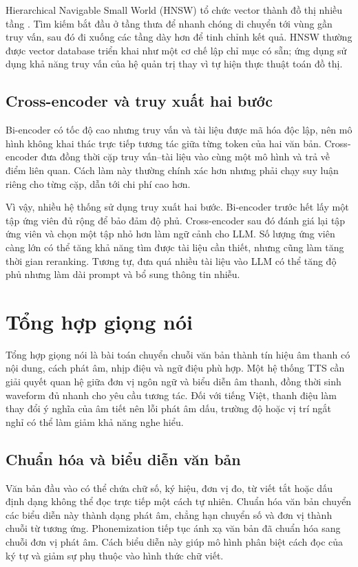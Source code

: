 \documentclass[a4paper,13pt,oneside]{report}
\begin{document}
Hierarchical Navigable Small World (HNSW) tổ chức vector thành đồ thị nhiều tầng \cite{hnsw}. Tìm kiếm bắt đầu ở tầng thưa để nhanh chóng di chuyển tới vùng gần truy vấn, sau đó đi xuống các tầng dày hơn để tinh chỉnh kết quả. HNSW thường được vector database triển khai như một cơ chế lập chỉ mục có sẵn; ứng dụng sử dụng khả năng truy vấn của hệ quản trị thay vì tự hiện thực thuật toán đồ thị.

\subsection{Cross-encoder và truy xuất hai bước}

Bi-encoder có tốc độ cao nhưng truy vấn và tài liệu được mã hóa độc lập, nên mô hình không khai thác trực tiếp tương tác giữa từng token của hai văn bản. Cross-encoder đưa đồng thời cặp truy vấn--tài liệu vào cùng một mô hình và trả về điểm liên quan. Cách làm này thường chính xác hơn nhưng phải chạy suy luận riêng cho từng cặp, dẫn tới chi phí cao hơn.

Vì vậy, nhiều hệ thống sử dụng truy xuất hai bước. Bi-encoder trước hết lấy một tập ứng viên đủ rộng để bảo đảm độ phủ. Cross-encoder sau đó đánh giá lại tập ứng viên và chọn một tập nhỏ hơn làm ngữ cảnh cho LLM. Số lượng ứng viên càng lớn có thể tăng khả năng tìm được tài liệu cần thiết, nhưng cũng làm tăng thời gian reranking. Tương tự, đưa quá nhiều tài liệu vào LLM có thể tăng độ phủ nhưng làm dài prompt và bổ sung thông tin nhiễu.

\section{Tổng hợp giọng nói}

Tổng hợp giọng nói là bài toán chuyển chuỗi văn bản thành tín hiệu âm thanh có nội dung, cách phát âm, nhịp điệu và ngữ điệu phù hợp. Một hệ thống TTS cần giải quyết quan hệ giữa đơn vị ngôn ngữ và biểu diễn âm thanh, đồng thời sinh waveform đủ nhanh cho yêu cầu tương tác. Đối với tiếng Việt, thanh điệu làm thay đổi ý nghĩa của âm tiết nên lỗi phát âm dấu, trường độ hoặc vị trí ngắt nghỉ có thể làm giảm khả năng nghe hiểu.

\subsection{Chuẩn hóa và biểu diễn văn bản}

Văn bản đầu vào có thể chứa chữ số, ký hiệu, đơn vị đo, từ viết tắt hoặc dấu định dạng không thể đọc trực tiếp một cách tự nhiên. Chuẩn hóa văn bản chuyển các biểu diễn này thành dạng phát âm, chẳng hạn chuyển số và đơn vị thành chuỗi từ tương ứng. Phonemization tiếp tục ánh xạ văn bản đã chuẩn hóa sang chuỗi đơn vị phát âm. Cách biểu diễn này giúp mô hình phân biệt cách đọc của ký tự và giảm sự phụ thuộc vào hình thức chữ viết.
\end{document}
